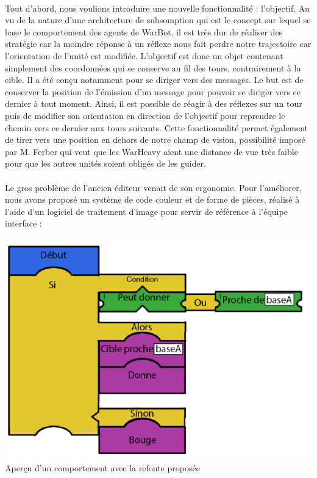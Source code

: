 \documentclass{report}
\begin{document}
\paragraph{}
  Tout d’abord, nous voulions introduire une nouvelle fonctionnalité : l’objectif. Au vu de la nature d’une architecture de subsomption qui est le concept sur lequel se base le comportement des agents de WarBot, il est très dur de réaliser des stratégie car la moindre réponse à un réflexe nous fait perdre notre trajectoire car l'orientation de l'unité est modifiée. \newline
L’objectif est donc un objet contenant simplement des coordonnées qui se conserve au fil des tours, contrairement à la cible. Il a été conçu notamment pour se diriger vers des messages. Le but est de conserver la position de l’émission d’un message pour pouvoir se diriger vers ce dernier à tout moment. \newline
Ainsi, il est possible de réagir à des réflexes sur un tour puis de modifier son orientation en direction de l’objectif pour reprendre le chemin vers ce dernier aux tours suivants. Cette fonctionnalité permet également de tirer vers une position en dehors de notre champ de vision, possibilité imposé par M. Ferber qui veut que les WarHeavy aient une distance de vue très faible pour que les autres unités soient obligés de les guider.
\newpage
\paragraph{}
  Le gros problème de l’ancien éditeur venait de son ergonomie. Pour l’améliorer, nous avons proposé un système de code couleur et de forme de pièces, réalisé à l’aide d'un logiciel de traitement d'image pour servir de référence à l’équipe interface :

\paragraph{}
\begin{center}
\includegraphics[scale=0.7]{DATA/propLangage.png}
 {Aperçu d'un comportement avec la refonte proposée}
\end{center}
\end{document}
